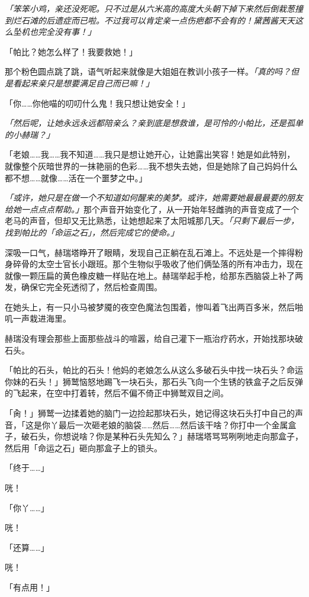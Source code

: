 \emph{「笨笨小鸡，亲还没死呢。只不过是从六米高的高度大头朝下掉下来然后倒栽葱撞到烂石滩的后遗症而已啦。不过我可以肯定亲一点伤疤都不会有的！黛茜酱天天这么坠机也完全没有事！」}

「帕比？她怎么样了！我要救她！」

那个粉色圆点跳了跳，语气听起来就像是大姐姐在教训小孩子一样。\emph{「真的吗？但是看起来亲只是想要满足自己而已嘛！」}

「你……你他喵的叨叨什么鬼！我只想让她安全！」

\emph{「然后呢，让她永远永远都陪亲么？亲到底是想救谁，是可怜的小帕比，还是孤单的小赫瑞？」}

「老娘……我……我不知道……我只是想让她开心，让她露出笑容！她是如此特别，就像整个灰暗世界的一抹艳丽的色彩……我不想失去她，但是她除了自己妈妈什么都不想……就像……活在一个噩梦之中。」

\emph{「或许，她只是在做一个不知道如何醒来的美梦。或许，她需要她最最最要的朋友给她一点点点帮助。」}那个声音开始变化了，从一开始年轻雌驹的声音变成了一个老马的声音，但却又无比熟悉，让她想起来了太阳城那几天。\emph{「只剩下最后一步，找到帕比的「命运之石」，然后完成它的使命。」}

深吸一口气，赫瑞塔睁开了眼睛，发现自己正躺在乱石滩上。不远处是一个摔得粉身碎骨的太空士官长小跟班。那个生物似乎吸收了他们俩坠落的所有冲击力，现在就像一颗压扁的黄色橡皮糖一样贴在地上。赫瑞举起手枪，给那东西脑袋上补了两发，确保它完全死透彻了，然后检查周围。

在她头上，有一只小马被梦魇的夜空色魔法包围着，惨叫着飞出两百多米，然后啪叽一声栽进海里。

赫瑞没有理会那些上面那些战斗的喧嚣，给自己灌下一瓶治疗药水，开始找那块破石头。

「帕比的石头，帕比的石头！他妈的老娘怎么从这么多破石头中找一块石头？命运你妹的石头！」狮鹫恼怒地踢飞一块石头，那石头飞向一个生锈的铁盒子之后反弹的飞起来，在空中打着转，然后不偏不倚正中狮鹫双目之间。

「肏！」狮鹫一边揉着她的脑门一边捡起那块石头，她记得这块石头打中自己的声音，「这是你丫最后一次砸老娘的脑袋……然后……然后该干啥？你打中一个金属盒子，破石头，你想说啥？你是某种石头先知么？」赫瑞塔骂骂咧咧地走向那盒子，然后用「命运之石」砸向那盒子上的锁头。

「终于……」

咣！

「你丫……」

咣！

「还算……」

咣！

「有点用！」


